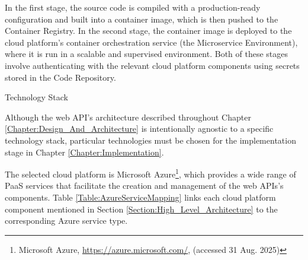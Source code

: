 \documentclass[12pt, reqno, oneside]{amsbook}
\makeatletter
\def\section{\@startsection{section}{1}%
      \z@{.5\linespacing\@plus.7\linespacing}{.25\linespacing}%
      {\normalfont\bfseries\flushleft}}
\theoremstyle{definition}
\theoremstyle{definition}
\numberwithin{section}{chapter}
\numberwithin{table}{chapter}
\numberwithin{figure}{chapter}
\makeatother
\begin{document}
In the first stage, the source code is compiled with a production-ready configuration and built into a container image, which is then pushed to the Container Registry. In the second stage, the container image is deployed to the cloud platform's container orchestration service (the Microservice Environment), where it is run in a scalable and supervised environment. Both of these stages involve authenticating with the relevant cloud platform components using secrets stored in the Code Repository.

\pagebreak

\section{Technology Stack}
\label{Section:Technology_Stack}

Although the web \ac{API}'s architecture described throughout Chapter \ref{Chapter:Design_And_Architecture} is intentionally agnostic to a specific technology stack, particular technologies must be chosen for the implementation stage in Chapter \ref{Chapter:Implementation}.

The selected cloud platform is Microsoft Azure\footnote{Microsoft Azure, \url{https://azure.microsoft.com/}, (accessed 31 Aug. 2025)}, which provides a wide range of \ac{PaaS} services that facilitate the creation and management of the web \acp{API}'s components. Table \ref{Table:AzureServiceMapping} links each cloud platform component mentioned in Section \ref{Section:High_Level_Architecture} to the corresponding Azure service type.
\end{document}
